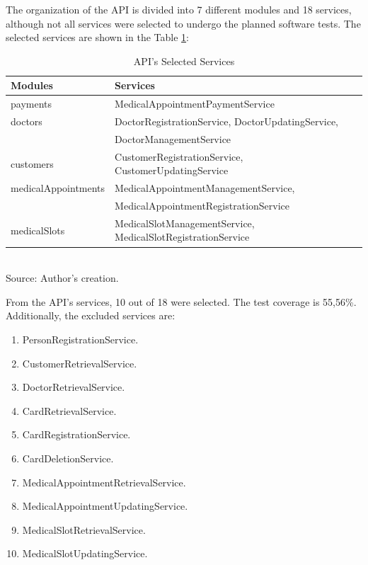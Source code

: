 The organization of the API is divided into 7 different modules and 18 services, although not all services were selected to undergo the planned software tests. The selected services are shown in the Table \ref{tab:selected_services}:

\begin{table}[H]
	\centering
	\caption{API's Selected Services}
	\label{tab:selected_services}
	\begin{tabular}{ll}
		\textbf{Modules} & \textbf{Services} \\ \hline
		payments & MedicalAppointmentPaymentService \\ \hline
		doctors & DoctorRegistrationService, DoctorUpdatingService, \\
		& DoctorManagementService \\ \hline
		customers & CustomerRegistrationService, CustomerUpdatingService \\ \hline
		medicalAppointments & MedicalAppointmentManagementService, \\
		& MedicalAppointmentRegistrationService \\ \hline
		medicalSlots & MedicalSlotManagementService, MedicalSlotRegistrationService \\ \hline
	\end{tabular}
	\\ \footnotesize Source: Author's creation.
\end{table}

From the API's services, 10 out of 18 were selected. The test coverage is 55,56\%. Additionally, the excluded services are:

\begin{enumerate}
    \item PersonRegistrationService.
    \item CustomerRetrievalService.
    \item DoctorRetrievalService.
    \item CardRetrievalService.
    \item CardRegistrationService.
    \item CardDeletionService.
    \item MedicalAppointmentRetrievalService.
    \item MedicalAppointmentUpdatingService.
    \item MedicalSlotRetrievalService.
    \item MedicalSlotUpdatingService.
\end{enumerate}

